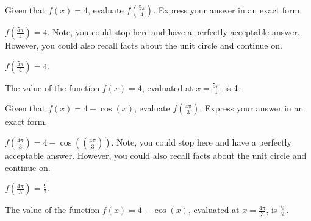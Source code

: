 \begin{shuffle}
\begin{exercise}
Given that $f(x)=4$, evaluate $f\left(\frac{5 \pi }{4}\right)$. Express your answer in an exact form.
\begin{solution}
\begin{hint}
$f\left(\frac{5 \pi }{4}\right)=4$. Note, you could stop here and have a perfectly acceptable answer. However, you could also recall facts about the unit circle and continue on. 
\end{hint}
\begin{hint}
$f\left(\frac{5 \pi }{4}\right)=4$.
\end{hint}
The value of the function $f(x) = 4$, evaluated at $x=\frac{5 \pi }{4}$, is ${4}$.
\end{solution}
\end{exercise}

\begin{exercise}
Given that $f(x)=4-\cos (x)$, evaluate $f\left(\frac{4 \pi }{3}\right)$. Express your answer in an exact form.
\begin{solution}
\begin{hint}
$f\left(\frac{4 \pi }{3}\right)=4-\cos (\left(\frac{4 \pi }{3}\right))$. Note, you could stop here and have a perfectly acceptable answer. However, you could also recall facts about the unit circle and continue on. 
\end{hint}
\begin{hint}
$f\left(\frac{4 \pi }{3}\right)=\frac{9}{2}$.
\end{hint}
The value of the function $f(x) = 4-\cos (x)$, evaluated at $x=\frac{4 \pi }{3}$, is ${\frac{9}{2}}$.
\end{solution}
\end{exercise}
\end{shuffle}


